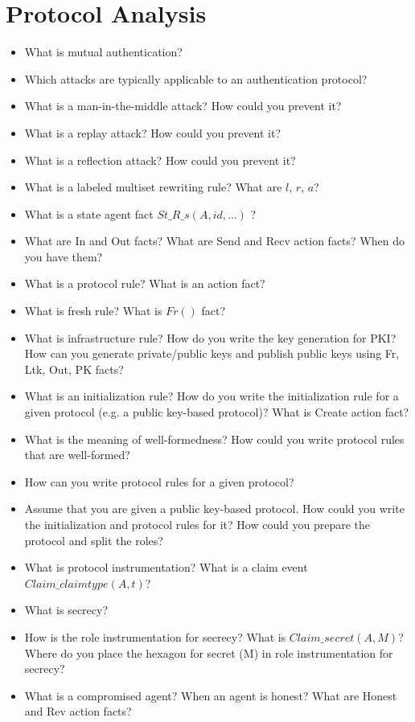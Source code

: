 \section{Protocol Analysis}\label{sec:Protocol_Analysis}
\begin{itemize}
\item What is mutual authentication?
\item Which attacks are typically applicable to an authentication protocol?
\item What is a man-in-the-middle attack? How could you prevent it?
\item What is a replay attack? How could you prevent it?
\item What is a reflection attack? How could you prevent it?
\item What is a labeled multiset rewriting rule? What are $l$, $r$, $a$?
\item What is a state agent fact $St\_R\_s(A, id, \ldots)$ ?
\item What are In and Out facts? What are Send and Recv action facts? When do you have them?
\item What is a protocol rule? What is an action fact?
\item What is fresh rule? What is $Fr()$ fact?
\item What is infrastructure rule? How do you write the key generation for PKI? How can you generate private/public keys and publish public keys using Fr, Ltk, Out, PK facts?
\item What is an initialization rule? How do you write the initialization rule for a given protocol (e.g. a public key-based protocol)? What is Create action fact?
\item What is the meaning of well-formedness? How could you write protocol rules that are well-formed?
\item How can you write protocol rules for a given protocol?
\item Assume that you are given a public key-based protocol. How could you write the initialization and protocol rules for it? How could you prepare the protocol and split the roles?
\item What is protocol instrumentation? What is a claim event $Claim\_claimtype(A,t)$?
\item What is secrecy?
\item How is the role instrumentation for secrecy? What is $Claim\_secret(A,M)$? Where do you place the hexagon for secret (M) in role instrumentation for secrecy?
\item What is a compromised agent? When an agent is honest? What are Honest and Rev action facts?

\end{itemize}
